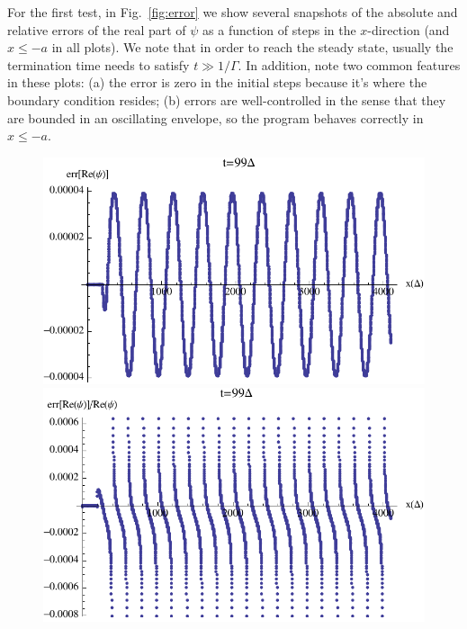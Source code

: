 \documentclass[final,1p,times]{elsarticle}
\begin{document}
For the first test, in Fig.~\ref{fig:error} we show several snapshots of the absolute and relative errors of the real part of $\psi$ as a function of steps in the $x$-direction (and $x\leq-a$ in all plots).
We note that in order to reach the steady state, usually the termination time needs to satisfy $t\gg1/\Gamma$. 
In addition, note two common features in these plots: (a) the error is zero in the initial steps because it's where the boundary condition resides; (b) errors are well-controlled in the sense that they are bounded in an oscillating envelope, so the program behaves correctly in $x\leq-a$.


\begin{figure}[htbp]%
	\centering
	\includegraphics[scale=0.5]{abs_error_t_99}
	\includegraphics[scale=0.5]{rel_error_t_99}\\
	\vspace{0.5cm}

\end{figure}
\end{document}
